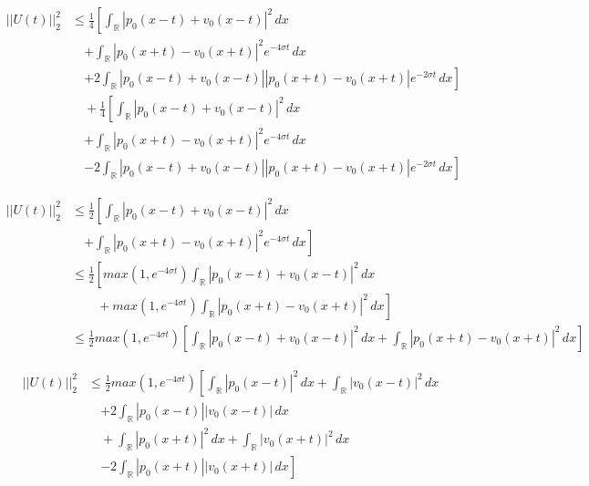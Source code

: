 \documentclass[a4paper,11pt]{article}
\begin{document}
\begin{equation*}
\begin{split}
    ||U(t)||^{2}_{2} & \le \frac{1}{4} \left[ \int_{\mathbb{R}}|p_0(x-t) + v_0(x-t)|^{2} \,dx \right. \\
   & \quad \left. + \int_{\mathbb{R}} |p_0(x+t) - v_0(x+t)|^{2}  e^{-4\sigma t} \,dx \right. \\
   & \quad \left. + 2 \int_{\mathbb{R}} |p_0(x-t) + v_0(x-t)| |p_0(x+t) - v_0(x+t)| e^{-2\sigma t} \,dx \right] \\
   & \quad + \frac{1}{4} \left[ \int_{\mathbb{R}}|p_0(x-t) + v_0(x-t)|^{2} \,dx \right. \\
   & \quad \left. + \int_{\mathbb{R}} |p_0(x+t) - v_0(x+t)|^{2}  e^{-4\sigma t} \,dx \right. \\
   & \quad \left. - 2 \int_{\mathbb{R}} |p_0(x-t) + v_0(x-t)| |p_0(x+t) - v_0(x+t)| e^{-2\sigma t} \,dx \right]
\end{split}
\end{equation*}

\begin{equation*}
\begin{split}
    ||U(t)||^{2}_{2} & \le \frac{1}{2} \left[ \int_{\mathbb{R}}|p_0(x-t) + v_0(x-t)|^{2} \,dx \right. \\
   & \quad \left. + \int_{\mathbb{R}} |p_0(x+t) - v_0(x+t)|^{2}  e^{-4\sigma t} \,dx \right] \\
   & \le \frac{1}{2} \left[ max(1, e^{-4\sigma t}) 
   \int_{\mathbb{R}} |p_0(x-t) + v_0(x-t)|^{2} \,dx \right. \\
   & \left. \qquad + max(1, e^{-4\sigma t}) 
   \int_{\mathbb{R}} |p_0(x+t) - v_0(x+t)|^{2} \,dx \right] \\
   & \le \frac{1}{2} max(1, e^{-4\sigma t}) \left[ \int_{\mathbb{R}} |p_0(x-t) + v_0(x-t)|^{2} \,dx + \int_{\mathbb{R}} |p_0(x+t) - v_0(x+t)|^{2} \,dx \right]
\end{split}
\end{equation*}

\begin{equation*}
\begin{split}
    ||U(t)||^{2}_{2} & \le \frac{1}{2} max(1, e^{-4\sigma t}) \left[ \int_{\mathbb{R}}|p_0(x-t)|^{2} \,dx + \int_{\mathbb{R}} |v_0(x-t)|^{2} \,dx \right. \\
   & \quad \left. + 2 \int_{\mathbb{R}} |p_0(x-t)| |v_0(x-t)| \,dx \right. \\
   & \quad + \left. \int_{\mathbb{R}}|p_0(x+t)|^{2} \,dx + \int_{\mathbb{R}} |v_0(x+t)|^{2} \,dx \right. \\
   & \quad \left. - 2 \int_{\mathbb{R}} |p_0(x+t)| |v_0(x+t)| \,dx \right] \\
\end{split}
\end{equation*}
\end{document}
